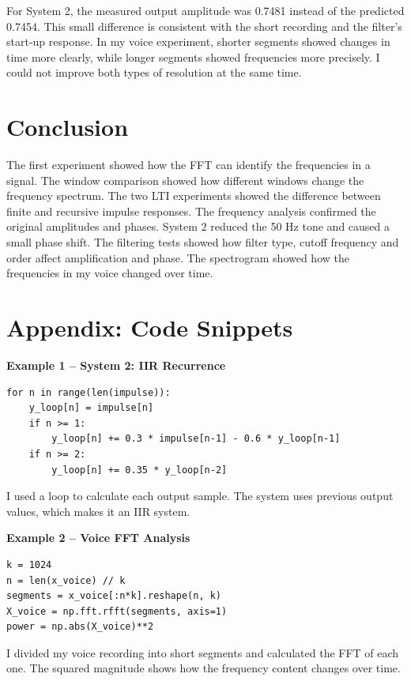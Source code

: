 \documentclass[11pt,a4paper]{article}
\begin{document}
For System 2, the measured output amplitude was 0.7481 instead of the predicted 0.7454. This small difference is consistent with the short recording and the filter's start-up response. In my voice experiment, shorter segments showed changes in time more clearly, while longer segments showed frequencies more precisely. I could not improve both types of resolution at the same time.

\section{Conclusion}
The first experiment showed how the FFT can identify the frequencies in a signal.
The window comparison showed how different windows change the frequency spectrum.
The two LTI experiments showed the difference between finite and recursive impulse responses.
The frequency analysis confirmed the original amplitudes and phases.
System 2 reduced the 50 Hz tone and caused a small phase shift.
The filtering tests showed how filter type, cutoff frequency and order affect amplification and phase.
The spectrogram showed how the frequencies in my voice changed over time.

\section*{Appendix: Code Snippets}
\textbf{Example 1 -- System 2: IIR Recurrence}
\begin{verbatim}
for n in range(len(impulse)):
    y_loop[n] = impulse[n]
    if n >= 1:
        y_loop[n] += 0.3 * impulse[n-1] - 0.6 * y_loop[n-1]
    if n >= 2:
        y_loop[n] += 0.35 * y_loop[n-2]
\end{verbatim}
I used a loop to calculate each output sample. The system uses previous output values, which makes it an IIR system.

\textbf{Example 2 -- Voice FFT Analysis}
\begin{verbatim}
k = 1024
n = len(x_voice) // k
segments = x_voice[:n*k].reshape(n, k)
X_voice = np.fft.rfft(segments, axis=1)
power = np.abs(X_voice)**2
\end{verbatim}
I divided my voice recording into short segments and calculated the FFT of each one. The squared magnitude shows how the frequency content changes over time.
\end{document}
